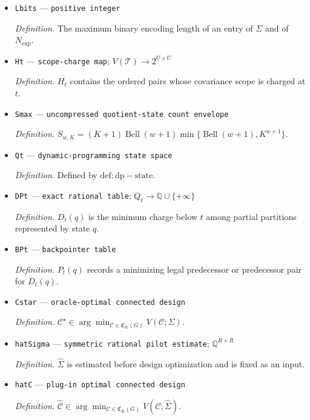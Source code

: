 \documentclass{article}
\begin{document}
\begin{itemize}
  \par\smallskip\noindent\emph{Definition.} \(w=\max_t|B_t|-1\).
  \item \texttt{Lbits} --- \texttt{positive integer}
  \par\smallskip\noindent\emph{Definition.} The maximum binary encoding length of an entry of \(\Sigma\) and of \(N_{\exp}\).
  \item \texttt{Ht} --- \texttt{scope-\allowbreak{}charge map}; \(V(\mathcal T)\to 2^{U\times U}\)
  \par\smallskip\noindent\emph{Definition.} \(H_t\) contains the ordered pairs whose covariance scope is charged at \(t\).
  \item \texttt{Smax} --- \texttt{uncompressed quotient-\allowbreak{}state count envelope}
  \par\smallskip\noindent\emph{Definition.} \(S_{w,K}=(K+1)\operatorname{Bell}(w+1)\min\{\operatorname{Bell}(w+1),K^{w+1}\}\).
  \item \texttt{Qt} --- \texttt{dynamic-\allowbreak{}programming state space}
  \par\smallskip\noindent\emph{Definition.} Defined by \(\mathrm{def:dp-state}\).
  \item \texttt{DPt} --- \texttt{exact rational table}; \(Q_t\to\mathbb Q\cup\{+\infty\}\)
  \par\smallskip\noindent\emph{Definition.} \(D_t(q)\) is the minimum charge below \(t\) among partial partitions represented by state \(q\).
  \item \texttt{BPt} --- \texttt{backpointer table}
  \par\smallskip\noindent\emph{Definition.} \(P_t(q)\) records a minimizing legal predecessor or predecessor pair for \(D_t(q)\).
  \item \texttt{Cstar} --- \texttt{oracle-\allowbreak{}optimal connected design}
  \par\smallskip\noindent\emph{Definition.} \(\mathcal C^\star\in\arg\min_{\mathcal C\in\mathfrak C_K(G)}V(\mathcal C;\Sigma)\).
  \item \texttt{hatSigma} --- \texttt{symmetric rational pilot estimate}; \(\mathbb Q^{R\times R}\)
  \par\smallskip\noindent\emph{Definition.} \(\widehat\Sigma\) is estimated before design optimization and is fixed as an input.
  \item \texttt{hatC} --- \texttt{plug-\allowbreak{}in optimal connected design}
  \par\smallskip\noindent\emph{Definition.} \(\widehat{\mathcal C}\in\arg\min_{\mathcal C\in\mathfrak C_K(G)}V(\mathcal C;\widehat\Sigma)\).

\end{itemize}
\end{document}
